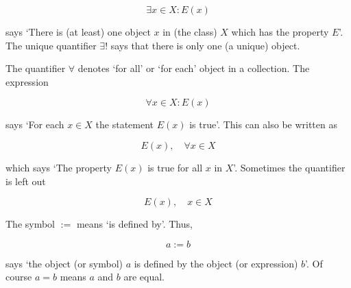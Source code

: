 $$
\exists x \in X : E(x)
$$

\noindent says `There is (at least) one object $x$ in (the class) $X$ which has the property $E$'.
The unique quantifier $\exists!$ says that there is only one (a unique) object.

The quantifier $\forall$ denotes `for all' or `for each' object in a collection.
The expression

\begin{equation}
    \forall x \in X : E(x)
\end{equation}

\noindent says `For each $x \in X$ the statement $E(x)$ is true'.
This can also be written as

\begin{equation}
    E(x), \quad \forall x \in X
\end{equation}

\noindent which says `The property $E(x)$ is true for all $x$ in $X$'.
Sometimes the quantifier is left out

\begin{equation}
    E(x), \quad x \in X
\end{equation}

The symbol $:=$ means `is defined by'.
Thus,

$$
a := b
$$

\noindent says `the object (or symbol) $a$ is defined by the object (or expression) $b$'.
Of course $a = b$ means $a$ and $b$ are equal.

